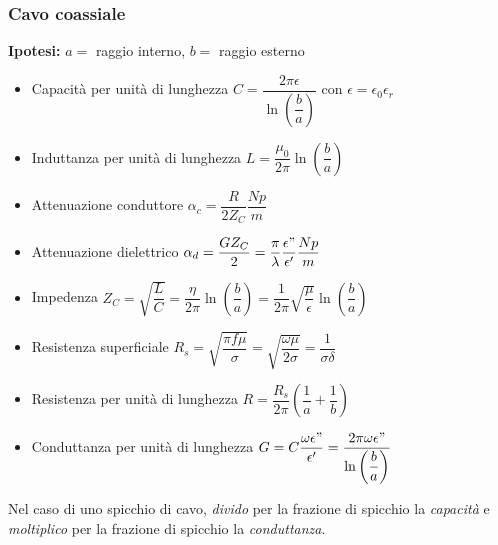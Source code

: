 \documentclass{article}
\begin{document}
\subsubsection{Cavo coassiale}
\textbf{Ipotesi:} \(a = \) raggio interno, \(b = \) raggio esterno 
\begin{itemize}
	\item Capacità per unità di lunghezza \( C = \dfrac{2 \pi \epsilon}{\ln\left(\dfrac{b}{a}\right)} \) con \( \epsilon = \epsilon_0 \epsilon_r \)
	\item Induttanza per unità di lunghezza \( L = \dfrac{\mu_0}{2 \pi} \ln\left(\dfrac{b}{a}\right) \)
	\item Attenuazione conduttore \( \alpha_c = \dfrac{R}{2 Z_C} \dfrac{Np}{m}\)
	\item Attenuazione dielettrico \( \alpha_d = \dfrac{G Z_C}{2} = \dfrac{\pi}{\lambda}\dfrac{\epsilon"}{\epsilon'} \dfrac{Np}{m}\)
	\item Impedenza \( Z_C = \sqrt{\dfrac{L}{C}} = \dfrac{\eta}{2 \pi} \ln\left(\dfrac{b}{a} \right) =  \dfrac{1}{2 \pi} \sqrt{\dfrac{\mu}{\epsilon}} \ln\left(\dfrac{b}{a}\right)\)
	\item Resistenza superficiale \( R_s = \sqrt{\dfrac{\pi f \mu}{\sigma}} = \sqrt{\dfrac{\omega \mu}{2 \sigma}} = \dfrac{1}{\sigma \delta} \)
	\item Resistenza per unità di lunghezza \( R = \dfrac{R_s}{2 \pi} \left( \dfrac{1}{a} + \dfrac{1}{b} \right) \)
	\item Conduttanza per unità di lunghezza \( G = C \dfrac{\omega\epsilon"}{\epsilon'} = \dfrac{2 \pi \omega \epsilon"}{\ln\left(\dfrac{b}{a} \right)} \)
\end{itemize}
Nel caso di uno spicchio di cavo, \textit{divido} per la frazione di spicchio la \textit{capacità} e \textit{moltiplico} per la frazione di spicchio la \textit{conduttanza}.
\end{document}
